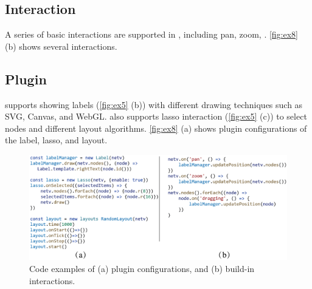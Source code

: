 

\subsection{Interaction}
A series of basic interactions are supported in \name, including pan, zoom,   . \autoref{fig:ex8} (b) shows several  interactions.

\subsection{Plugin}

\name supports showing labels (\autoref{fig:ex5} (b)) with different drawing techniques\added[id=kg]{,} such as SVG, Canvas, and WebGL. \name also supports lasso interaction (\autoref{fig:ex5} (c)) to select nodes and different layout algorithms. \autoref{fig:ex8} (a) shows  plugin configurations of the label, lasso, and layout.


\begin{figure}
    \includegraphics[width=\linewidth]{fig/ex8.eps}
    \caption{
        Code examples of (a) plugin configurations, and (b) build-in interactions.
    }
    \label{fig:ex8}
\end{figure}

